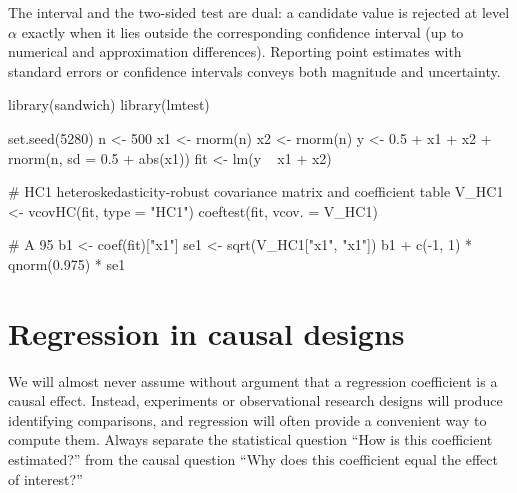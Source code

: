 The interval and the two-sided test are dual: a candidate value is rejected
at level $\alpha$ exactly when it lies outside the corresponding confidence
interval (up to numerical and approximation differences).  Reporting point
estimates with standard errors or confidence intervals conveys both magnitude
and uncertainty.

\begin{rcode}
library(sandwich)
library(lmtest)

set.seed(5280)
n <- 500
x1 <- rnorm(n)
x2 <- rnorm(n)
y <- 0.5 + x1 + x2 + rnorm(n, sd = 0.5 + abs(x1))
fit <- lm(y ~ x1 + x2)

# HC1 heteroskedasticity-robust covariance matrix and coefficient table
V_HC1 <- vcovHC(fit, type = "HC1")
coeftest(fit, vcov. = V_HC1)

# A 95%
b1 <- coef(fit)["x1"]
se1 <- sqrt(V_HC1["x1", "x1"])
b1 + c(-1, 1) * qnorm(0.975) * se1
\end{rcode}

\section{Regression in causal designs}

We will almost never assume without argument that a regression coefficient is
a causal effect.  Instead, experiments or observational research designs will
produce identifying comparisons, and regression will often provide a
convenient way to compute them.  Always separate the statistical question
``How is this coefficient estimated?'' from the causal question ``Why does
this coefficient equal the effect of interest?''
